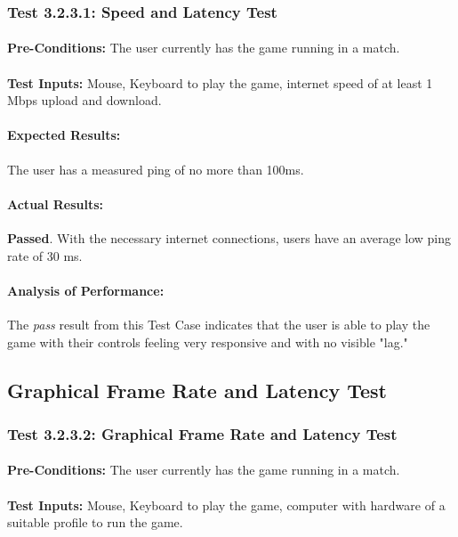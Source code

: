 \documentclass{article}
\begin{document}
\subsubsection{Test 3.2.3.1: Speed and Latency Test }
    \paragraph{}\textbf{Pre-Conditions:} The user currently has the game running in a match.
    \paragraph{}\textbf{Test Inputs:} Mouse, Keyboard to play the game, internet speed of at least 1 Mbps upload and download.
    \paragraph{Expected Results:} The user has a measured ping of no more than 100ms.
    \paragraph{Actual Results:} \textbf{Passed}. With the necessary internet connections, users have an average low ping rate of 30 ms. 
    \paragraph{Analysis of Performance:} The \emph{pass} result from this Test Case indicates that the user is able to play the game with their controls feeling very responsive and with no visible "lag."
\subsection{Graphical Frame Rate and Latency Test}
\subsubsection{Test 3.2.3.2: Graphical Frame Rate and Latency Test }
    \paragraph{}\textbf{Pre-Conditions:} The user currently has the game running in a match.
    \paragraph{}\textbf{Test Inputs:} Mouse, Keyboard to play the game, computer with hardware of a suitable profile to run the game.
\end{document}
